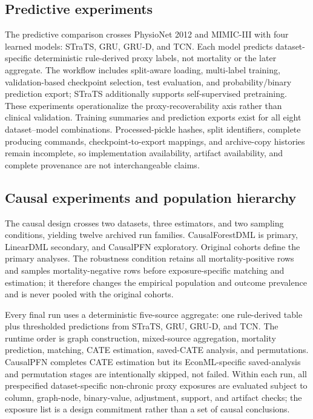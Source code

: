 \subsection{Predictive experiments}
\label{sec:experimental-design:prediction-experiment-matrix}

The predictive comparison crosses PhysioNet 2012 and MIMIC-III with four learned models: STraTS, GRU, GRU-D, and TCN.  Each model predicts dataset-specific deterministic rule-derived proxy labels, not mortality or the later aggregate.  The workflow includes split-aware loading, multi-label training, validation-based checkpoint selection, test evaluation, and probability/binary prediction export; STraTS additionally supports self-supervised pretraining.  These experiments operationalize the proxy-recoverability axis rather than clinical validation.  Training summaries and prediction exports exist for all eight dataset--model combinations.  Processed-pickle hashes, split identifiers, complete producing commands, checkpoint-to-export mappings, and archive-copy histories remain incomplete, so implementation availability, artifact availability, and complete provenance are not interchangeable claims.

\subsection{Causal experiments and population hierarchy}
\label{sec:experimental-design:causal-experiment-matrix}

The causal design crosses two datasets, three estimators, and two sampling conditions, yielding twelve archived run families.  CausalForestDML is primary, LinearDML secondary, and CausalPFN exploratory.  Original cohorts define the primary analyses.  The robustness condition retains all mortality-positive rows and samples mortality-negative rows before exposure-specific matching and estimation; it therefore changes the empirical population and outcome prevalence and is never pooled with the original cohorts.

Every final run uses a deterministic five-source aggregate: one rule-derived table plus thresholded predictions from STraTS, GRU, GRU-D, and TCN.  The runtime order is graph construction, mixed-source aggregation, mortality prediction, matching, CATE estimation, saved-CATE analysis, and permutations.  CausalPFN completes CATE estimation but its EconML-specific saved-analysis and permutation stages are intentionally skipped, not failed.  Within each run, all prespecified dataset-specific non-chronic proxy exposures are evaluated subject to column, graph-node, binary-value, adjustment, support, and artifact checks; the exposure list is a design commitment rather than a set of causal conclusions.

